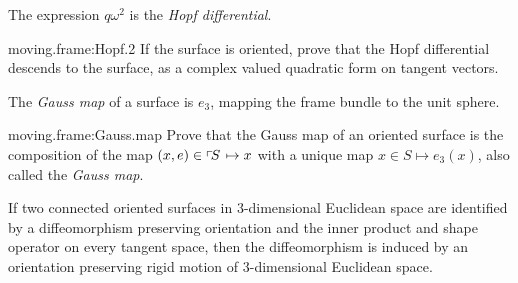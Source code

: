 The expression \(q\omega^2\) is the \emph{Hopf differential}.
\begin{problem}{moving.frame:Hopf.2}
If the surface is oriented, prove that the Hopf differential descends to the surface, as a complex valued quadratic form on tangent vectors.
\end{problem}
The \emph{Gauss map} of a surface is \(e_3\), mapping the frame bundle to the unit sphere.
\begin{problem}{moving.frame:Gauss.map}
Prove that the Gauss map of an oriented surface is the composition of the map \((x,e)\in\left\ulcorner\!S\right.\mapsto x\) with a unique map \(x \in S\mapsto e_3(x)\), also called the \emph{Gauss map}.
\end{problem}


\begin{theorem}[Bonnet]
If two connected oriented surfaces in \(3\)-dimensional Euclidean space are identified by  a diffeomorphism preserving orientation and the inner product and shape operator on every tangent space, then the diffeomorphism is induced by an orientation preserving rigid motion of \(3\)-dimensional Euclidean space.
\end{theorem}
